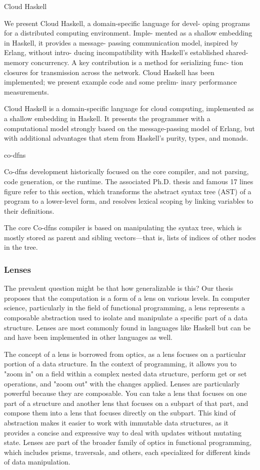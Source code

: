 \documentclass[10pt,a4paper]{article}
\begin{document}
Cloud Haskell

We present Cloud Haskell, a domain-specific language for devel- oping programs for a distributed computing environment. Imple- mented as a shallow embedding in Haskell, it provides a message- passing communication model, inspired by Erlang, without intro- ducing incompatibility with Haskell’s established shared-memory concurrency. A key contribution is a method for serializing func- tion closures for transmission across the network. Cloud Haskell has been implemented; we present example code and some prelim- inary performance measurements.

Cloud Haskell is a domain-specific language for cloud computing, implemented as a shallow embedding in Haskell. It presents the programmer with a computational model strongly based on the message-passing model of Erlang, but with additional advantages that stem from Haskell’s purity, types, and monads.

co-dfns

Co-dfns development historically focused on the core compiler, and not parsing, code generation, or the runtime. The associated Ph.D. thesis and famous 17 lines figure refer to this section, which transforms the abstract syntax tree (AST) of a program to a lower-level form, and resolves lexical scoping by linking variables to their definitions.

The core Co-dfns compiler is based on manipulating the syntax tree, which is mostly stored as parent and sibling vectors—that is, lists of indices of other nodes in the tree.

\subsubsection{Lenses}

The prevalent question might be that how generalizable is this?
Our thesis proposes that the computation is a form of a lens on various levels.
In computer science, particularly in the field of functional programming, a lens represents a composable abstraction used to isolate and manipulate a specific part of a data structure. Lenses are most commonly found in languages like Haskell but can be and have been implemented in other languages as well.

The concept of a lens is borrowed from optics, as a lens focuses on a particular portion of a data structure. In the context of programming, it allows you to "zoom in" on a field within a complex nested data structure, perform get or set operations, and "zoom out" with the changes applied.
Lenses are particularly powerful because they are composable. You can take a lens that focuses on one part of a structure and another lens that focuses on a subpart of that part, and compose them into a lens that focuses directly on the subpart.
This kind of abstraction makes it easier to work with immutable data structures, as it provides a concise and expressive way to deal with updates without mutating state. Lenses are part of the broader family of optics in functional programming, which includes prisms, traversals, and others, each specialized for different kinds of data manipulation.
\end{document}

